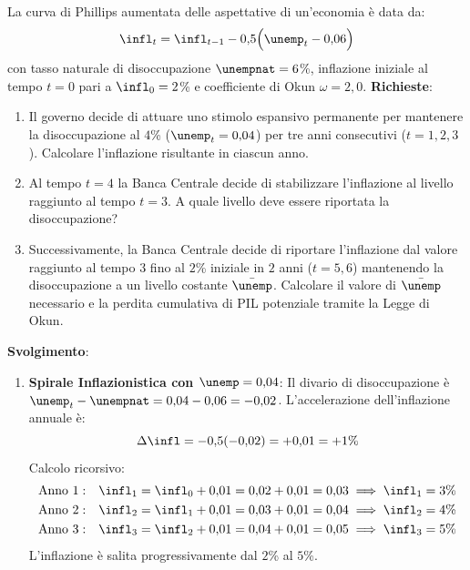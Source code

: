 \begin{esercizio}
La curva di Phillips aumentata delle aspettative di un'economia è data da:
\begin{equation*}
    \infl_t = \infl_{t-1} - 0{,}5 \Big( \unemp_t - 0{,}06 \Big)
\end{equation*}
con tasso naturale di disoccupazione $\unempnat = 6$\%, inflazione iniziale al tempo $t=0$ pari a $\infl_0 = 2$\% e coefficiente di Okun $\omega = 2{,}0$.
\textbf{Richieste}:
\begin{enumerate}
    \item Il governo decide di attuare uno stimolo espansivo permanente per mantenere la disoccupazione al $4$\% ($\unemp_t = 0{,}04$) per tre anni consecutivi ($t=1, 2, 3$). Calcolare l'inflazione risultante in ciascun anno.
    \item Al tempo $t=4$ la Banca Centrale decide di stabilizzare l'inflazione al livello raggiunto al tempo $t=3$. A quale livello deve essere riportata la disoccupazione?
    \item Successivamente, la Banca Centrale decide di riportare l'inflazione dal valore raggiunto al tempo $3$ fino al $2$\% iniziale in $2$ anni ($t=5, 6$) mantenendo la disoccupazione a un livello costante $\bar{\unemp}$. Calcolare il valore di $\bar{\unemp}$ necessario e la perdita cumulativa di PIL potenziale tramite la Legge di Okun.
\end{enumerate}

\textbf{Svolgimento}:
\begin{enumerate}
    \item \textbf{Spirale Inflazionistica con $\unemp = 0{,}04$}:
    Il divario di disoccupazione è $\unemp_t - \unempnat = 0{,}04 - 0{,}06 = -0{,}02$.
    L'accelerazione dell'inflazione annuale è:
    \begin{equation*}
        \Delta \infl = -0{,}5(-0{,}02) = +0{,}01 = +1\%
    \end{equation*}
    Calcolo ricorsivo:
    \begin{align*}
        \text{Anno 1}: &\quad \infl_1 = \infl_0 + 0{,}01 = 0{,}02 + 0{,}01 = 0{,}03 \implies \infl_1 = 3\% \\
        \text{Anno 2}: &\quad \infl_2 = \infl_1 + 0{,}01 = 0{,}03 + 0{,}01 = 0{,}04 \implies \infl_2 = 4\% \\
        \text{Anno 3}: &\quad \infl_3 = \infl_2 + 0{,}01 = 0{,}04 + 0{,}01 = 0{,}05 \implies \infl_3 = 5\%
    \end{align*}
    L'inflazione è salita progressivamente dal $2$\% al $5$\%.


\end{enumerate}
\end{esercizio}
